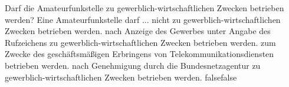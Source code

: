     {Darf die Amateurfunkstelle zu gewerblich-wirtschaftlichen Zwecken betrieben werden? Eine Amateurfunkstelle darf ...}
    {nicht zu gewerblich-wirtschaftlichen Zwecken betrieben werden.}
    {nach Anzeige des Gewerbes unter Angabe des Rufzeichens zu gewerblich-wirtschaftlichen Zwecken betrieben werden.}
    {zum Zwecke des geschäftsmäßigen Erbringens von Telekommunikationsdiensten betrieben werden.}
    {nach Genehmigung durch die Bundesnetzagentur zu gewerblich-wirtschaftlichen Zwecken betrieben werden.}
    {false}{false}